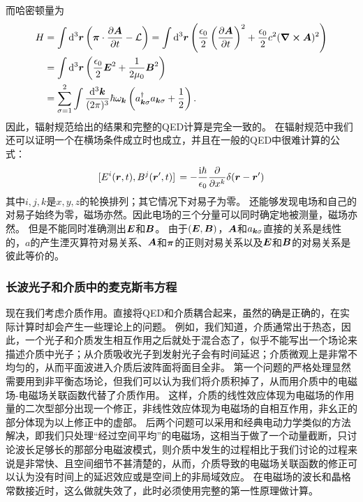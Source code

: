 而哈密顿量为
\begin{equation}
    \begin{aligned}
        H &= \int \dd[3]{\vb*{r}} \left(\vb*{\pi} \cdot \pdv{\vb*{A}}{t} - \mathcal{L} \right) = \int \dd[3]{\vb*{r}} \left( \frac{\epsilon_0}{2} \left(\pdv{\vb*{A}}{t}\right)^2 + \frac{\epsilon_0}{2} c^2 (\curl{\vb*{A}})^2 \right) \\
        &= \int \dd[3]{\vb*{r}} \left( \frac{\epsilon_0}{2} \vb*{E}^2 + \frac{1}{2\mu_0} \vb*{B}^2 \right) \\
        &= \sum_{\sigma=1}^2 \int \frac{\dd[3]{\vb*{k}}}{(2\pi)^3} \hbar \omega_{\vb*{k}} \left(a^\dagger_{\vb*{k} \sigma} a_{\vb*{k} \sigma} + \frac{1}{2} \right).
    \end{aligned}
\end{equation}
因此，辐射规范给出的结果和完整的QED计算是完全一致的。
在辐射规范中我们还可以证明一个在横场条件成立时也成立，并且在一般的QED中很难计算的公式：
\begin{equation}
    \comm*{E^i(\vb*{r}, t)}{B^j(\vb*{r}', t)} = - \frac{\ii \hbar}{\epsilon_0} \pdv{x^k} \delta(\vb*{r} - \vb*{r}')
\end{equation}
其中$i, j, k$是$x, y, z$的轮换排列；其它情况下对易子为零。
还能够发现电场和自己的对易子始终为零，磁场亦然。因此电场的三个分量可以同时确定地被测量，磁场亦然。
但是不能同时准确测出$\vb*{E}$和$\vb*{B}$。
由于$(\vb*{E}, \vb*{B})$，$\vb*{A}$和$a_{\vb*{k} \sigma}$直接的关系是线性的，$a$的产生湮灭算符对易关系、$\vb*{A}$和$\vb*{\pi}$的正则对易关系以及$\vb*{E}$和$\vb*{B}$的对易关系是彼此等价的。

\subsubsection{长波光子和介质中的麦克斯韦方程}

现在我们考虑介质作用。直接将QED和介质耦合起来，虽然的确是正确的，在实际计算时却会产生一些理论上的问题。
例如，我们知道，介质通常出于热态，因此，一个光子和介质发生相互作用之后就处于混合态了，似乎不能写出一个场论来描述介质中光子；从介质吸收光子到发射光子会有时间延迟；介质微观上是非常不均匀的，从而平面波进入介质后波阵面将面目全非。
第一个问题的严格处理显然需要用到非平衡态场论，但我们可以认为我们将介质积掉了，从而用介质中的电磁场-电磁场关联函数代替了介质作用。
这样，介质的线性效应体现为电磁场的作用量的二次型部分出现一个修正，非线性效应体现为电磁场的自相互作用，非幺正的部分体现为以上修正中的虚部。
后两个问题可以采用和经典电动力学类似的方法解决，即我们只处理“经过空间平均”的电磁场，这相当于做了一个动量截断，只讨论波长足够长的那部分电磁波模式，则介质中发生的过程相比于我们讨论的过程来说是非常快、且空间细节不甚清楚的，从而，介质导致的电磁场关联函数的修正可以认为没有时间上的延迟效应或是空间上的非局域效应。
在电磁场的波长和晶格常数接近时，这么做就失效了，此时必须使用完整的第一性原理做计算。

